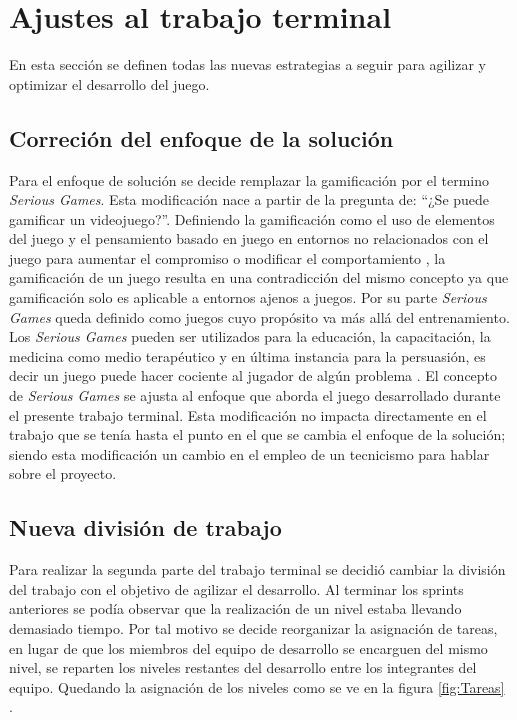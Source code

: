 \section{Ajustes al trabajo terminal}
En esta sección se definen todas las nuevas estrategias a seguir para agilizar y 
optimizar el desarrollo del juego.

\subsection{Correción del enfoque de la solución}
Para el enfoque de solución se decide remplazar la gamificación por el termino 
\textit{Serious Games}. Esta modificación nace a partir de la pregunta de: 
“¿Se puede gamificar un videojuego?”. Definiendo la gamificación como el uso de 
elementos del juego y el pensamiento basado en juego en entornos no relacionados 
con el juego para aumentar el compromiso o modificar el comportamiento
\cite{RefIntroGamificacion}, la gamificación de un juego resulta en una contradicción 
del mismo concepto ya que gamificación solo es aplicable a entornos ajenos a 
juegos. Por su parte \textit{Serious Games} queda definido como juegos cuyo 
propósito va más allá del entrenamiento\cite{Ref:Serious}. Los 
\textit{Serious Games} pueden ser utilizados para la educación, la capacitación, 
la medicina como medio terapéutico y en última instancia para la persuasión, es 
decir un juego puede hacer cociente al jugador de algún problema 
\cite{ferreira2002serious}. El concepto de \textit{Serious Games} se ajusta 
al enfoque que aborda el juego desarrollado durante el presente trabajo terminal. 
Esta modificación no impacta directamente en el trabajo que se tenía hasta el 
punto en el que se cambia el enfoque de la solución; siendo esta modificación 
un cambio en el empleo de un tecnicismo para hablar sobre el proyecto.


\subsection{Nueva división de trabajo} \label{Sec:AsignacionTrabajo}
Para realizar la segunda parte del trabajo terminal se decidió cambiar la división 
del trabajo con el objetivo de agilizar el desarrollo. Al terminar los sprints 
anteriores se podía observar que la realización de un nivel estaba llevando 
demasiado tiempo. Por tal motivo se decide reorganizar la asignación de 
tareas, en lugar de que los miembros del equipo de desarrollo se encarguen del 
mismo nivel, se reparten los niveles restantes del desarrollo entre los 
integrantes del equipo. Quedando la asignación de los niveles como se ve en la 
figura \ref{fig:Tareas} .

